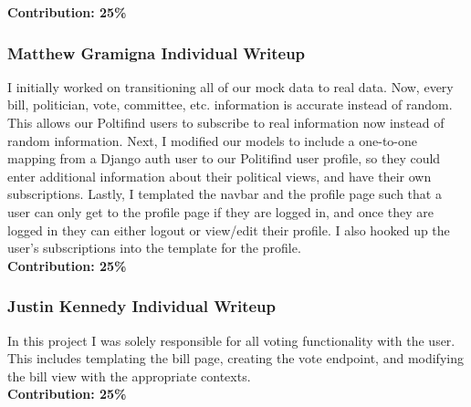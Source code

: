 \documentclass{article}
\newcommand{\n}{\noindent}
\begin{document}
\n\textbf{Contribution: 25\%}
\pagebreak

\subsubsection*{Matthew Gramigna Individual Writeup}

I initially worked on transitioning all of our mock data to real data. Now, every bill, politician, vote, committee, etc. information is accurate instead of random. This allows our Poltifind users to subscribe to real information now instead of random information. Next, I modified our models to include a one-to-one mapping from a Django auth user to our Politifind user profile, so they could enter additional information about their political views, and have their own subscriptions. Lastly, I templated the navbar and the profile page such that a user can only get to the profile page if they are logged in, and once they are logged in they can either logout or view/edit their profile. I also hooked up the user's subscriptions into the template for the profile.\\

\n\textbf{Contribution: 25\%}

\pagebreak

\subsubsection*{Justin Kennedy Individual Writeup}

In this project I was solely responsible for all voting functionality with the user.  This includes templating the bill page, creating the vote endpoint, and modifying the bill view with the appropriate contexts.\\

\n\textbf{Contribution: 25\%}
\end{document}
